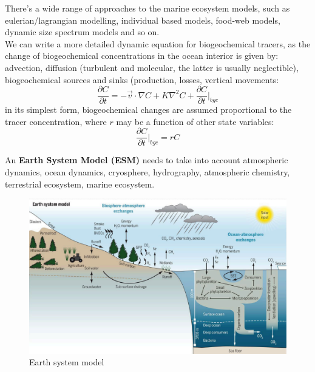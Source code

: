 There's a wide range of approaches to the marine ecosystem models, such as eulerian/lagrangian modelling, individual based models, food-web models, dynamic size spectrum models and so on. \\

We can write a more detailed dynamic equation for biogeochemical tracers, as the change of biogeochemical concentrations in the ocean interior is given by: advection, diffusion (turbulent and molecular, the latter is usually neglectible), biogeochemical sources and sinks (production, losses, vertical movements:
\begin{equation}
	\frac{\partial C}{\partial t}=-\vec{v}\cdot\nabla C+K\nabla^2 C+\frac{\partial C}{\partial t}\big|_{bgc}
\end{equation}
in its simplest form, biogeochemical changes are assumed proportional to the tracer concentration, where $r$ may be a function of other state variables:
$$\frac{\partial C}{\partial t}\big|_{bgc} =rC$$


An \textbf{Earth System Model (ESM)} needs to take into account atmospheric dynamics, ocean dynamics, cryosphere, hydrography, atmospheric chemistry, terrestrial ecosystem, marine ecosystem.
\begin{figure}[htpb]
	\centering
	\includegraphics[width=0.5\linewidth]{uploads/Earth system model.png}
	\caption{Earth system model}
	\label{fig:enter-label}
\end{figure}

